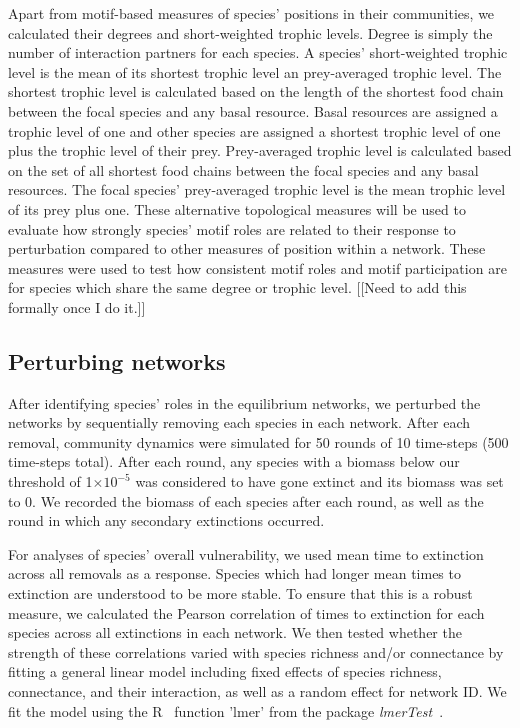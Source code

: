 \documentclass[12pt]{article}
\begin{document}
		Apart from motif-based measures of species' positions in their communities, we calculated their degrees and short-weighted trophic levels. Degree is simply the number of interaction partners for each species. A species' short-weighted trophic level is the mean of its shortest trophic level an prey-averaged trophic level. The shortest trophic level is calculated based on the length of the shortest food chain between the focal species and any basal resource. Basal resources are assigned a trophic level of one and other species are assigned a shortest trophic level of one plus the trophic level of their prey. Prey-averaged trophic level is calculated based on the set of all shortest food chains between the focal species and any basal resources. The focal species' prey-averaged trophic level is the mean trophic level of its prey plus one. These alternative topological measures will be used to evaluate how strongly species' motif roles are related to their response to perturbation compared to other measures of position within a network. These measures were used to test how consistent motif roles and motif participation are for species which share the same degree or trophic level. [[Need to add this formally once I do it.]]


	\subsection*{Perturbing networks}

		After identifying species' roles in the equilibrium networks, we perturbed the networks by sequentially removing each species in each network. After each removal, community dynamics were simulated for 50 rounds of 10 time-steps (500 time-steps total). After each round, any species with a biomass below our threshold of 1$\times10^{-5}$ was considered to have gone extinct and its biomass was set to 0. We recorded the biomass of each species after each round, as well as the round in which any secondary extinctions occurred.


		For analyses of species' overall vulnerability, we used mean time to extinction across all removals as a response. Species which had longer mean times to extinction are understood to be more stable. To ensure that this is a robust measure, we calculated the Pearson correlation of times to extinction for each species across all extinctions in each network. We then tested whether the strength of these correlations varied with species richness and/or connectance by fitting a general linear model including fixed effects of species richness, connectance, and their interaction, as well as a random effect for network ID. We fit the model using the R~\citep{R} function 'lmer' from the package \emph{lmerTest}~\citep{lmerTest}.
\end{document}
